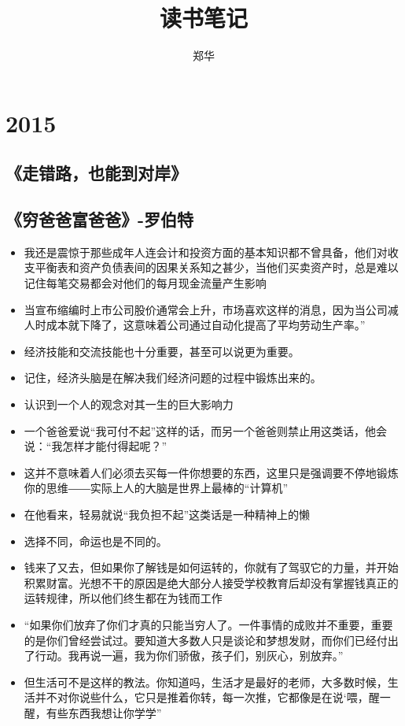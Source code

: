 \documentclass[UTF8,a4paper,8pt]{ctexbook}
\author{郑华}
\title{读书笔记}
\begin{document}
 	\maketitle
 	\tableofcontents
\chapter{2015}
	\section{《走错路，也能到对岸》 }
	
	\newpage
	\section{《穷爸爸富爸爸》-罗伯特 }
		\begin{itemize}
			\item 我还是震惊于那些成年人连会计和投资方面的基本知识都不曾具备，他们对收支平衡表和资产负债表间的因果关系知之甚少，当他们买卖资产时，总是难以记住每笔交易都会对他们的每月现金流量产生影响
			\item 当宣布缩编时上市公司股价通常会上升，市场喜欢这样的消息，因为当公司减人时成本就下降了，这意味着公司通过自动化提高了平均劳动生产率。”
			\item 经济技能和交流技能也十分重要，甚至可以说更为重要。
			\item 记住，经济头脑是在解决我们经济问题的过程中锻炼出来的。
			\item 认识到一个人的观念对其一生的巨大影响力
			\item 一个爸爸爱说“我可付不起”这样的话，而另一个爸爸则禁止用这类话，他会说：“我怎样才能付得起呢？”
			\item 这并不意味着人们必须去买每一件你想要的东西，这里只是强调要不停地锻炼你的思维――实际上人的大脑是世界上最棒的“计算机”
			\item 在他看来，轻易就说“我负担不起”这类话是一种精神上的懒
			\item 选择不同，命运也是不同的。
			\item 钱来了又去，但如果你了解钱是如何运转的，你就有了驾驭它的力量，并开始积累财富。光想不干的原因是绝大部分人接受学校教育后却没有掌握钱真正的运转规律，所以他们终生都在为钱而工作
			\item “如果你们放弃了你们才真的只能当穷人了。一件事情的成败并不重要，重要的是你们曾经尝试过。要知道大多数人只是谈论和梦想发财，而你们已经付出了行动。我再说一遍，我为你们骄傲，孩子们，别灰心，别放弃。”
			\item 但生活可不是这样的教法。你知道吗，生活才是最好的老师，大多数时候，生活并不对你说些什么，它只是推着你转，每一次推，它都像是在说‘喂，醒一醒，有些东西我想让你学学”

\end{itemize}
\end{document}

